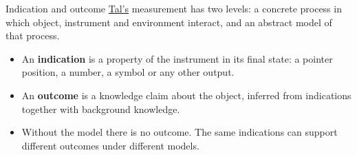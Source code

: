 \documentclass[aspectratio=169,11pt]{beamer}
\begin{document}
\begin{frame}[label=indication]{Indication and outcome}
\href{https://plato.stanford.edu/entries/measurement-science/}{Tal's} measurement has two levels: a concrete process in which object, instrument and environment interact, and an abstract model of that process.

\vspace{0.2em}
\begin{center}
\end{center}

\begin{itemize}\setlength\itemsep{1pt}
  \item {\small An \textbf{\textcolor{report}{indication}} is a property of the instrument in its final state: a pointer position, a number, a symbol or any other output.}
  \item {\small An \textbf{\textcolor{pass}{outcome}} is a knowledge claim about the object, inferred from indications together with background knowledge.}
  \item {\small Without the model there is no outcome. The same indications can support different outcomes under different models.}
\end{itemize}
\end{frame}
\end{document}

